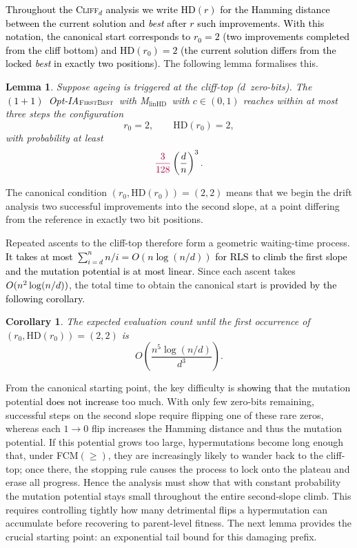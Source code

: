 \documentclass[lettersize,journal]{IEEEtran}
\newcommand{\new}[1]{\textcolor{black}{#1}}
\newcommand{\rev}[1]{\textcolor{black}{#1}}
\newcommand{\rerev}[1]{\textcolor{purple}{#1}}
\newcommand{\cliff}{\textsc{Cliff}$_d$}
\newcommand{\linHD}{M$_{\text{linHD}}$}
\newcommand{\firstBest}{$(1+1)$~Opt-IA$_{\textsc{FirstBest}}$}
\newtheorem{corollary}{Corollary}
\newtheorem{lemma}{Lemma}
\begin{document}
{\textcolor{black}{Throughout the \cliff{} analysis we write $\mathrm{HD}(r)$ for
the Hamming distance between the current solution and \emph{best} after $r$
such improvements.
With this notation, the canonical start corresponds to
$r_0 = 2$ (two improvements completed from the cliff bottom)
and $\mathrm{HD}(r_0) = 2$ (the current solution differs from the locked
\emph{best} in exactly two positions).}  The following lemma formalises this.

\begin{lemma}\label{lem:can-start-omega-d3}
	Suppose ageing is triggered at the cliff-top ($d$~zero-bits).  
	The \rev{\firstBest}~with \linHD\ with $c\in(0,1)$ reaches within at most three steps the 
	configuration
	\[
	r_0=2, \qquad \mathrm{HD}(r_0)=2,
	\]
	with probability at least 
	\[
	\rerev{\frac{3}{128}}\left(\frac{d}{n}\right)^3.
	\]
\end{lemma}


The canonical condition $(r_0,\mathrm{HD}(r_0)) =
(2,2)$ means that we begin the drift analysis two successful improvements into
the second slope, at a point differing from the reference in exactly two
bit positions.

Repeated ascents to the cliff-top therefore form a geometric waiting-time 
process.   \rev{It takes at most $\sum_{i=d}^{n}n/i=O(n\log(n/d))$ for RLS to climb the first slope and the mutation potential is at most linear.
} Since each ascent takes $\rev{O}(n^2\log(n/d))$, the 
total time to obtain the canonical start is \new{provided by the following corollary}.

\begin{corollary}
The expected evaluation count until the first occurrence of 
	$(r_0,\mathrm{HD}(r_0)) = (2,2)$ is 
	\[
	O\!\left(\frac{n^{5}\log(n/d)}{d^{3}}\right).
	\]
\end{corollary}


From the canonical starting point, the key difficulty is \new{showing that} the mutation
potential \new{does not increase} too much.  With only few zero-bits remaining, successful
steps on the second slope require flipping one of these rare zeros, whereas each
$1\!\to0$ flip increases the Hamming distance and thus the mutation potential.
If this potential grows too large, hypermutations become long enough that, under
FCM$(\ge)$, they are increasingly likely to wander back to the cliff-top; once
there, the stopping rule causes the process to lock onto the plateau and erase
all progress.  Hence the analysis must show that with constant probability the
mutation potential stays small throughout the entire second-slope climb.  This
requires  controlling tightly how many detrimental flips a hypermutation can
accumulate before recovering to parent-level fitness.  The next lemma provides
the crucial starting point: an exponential tail bound for this damaging prefix.

}
\end{document}
